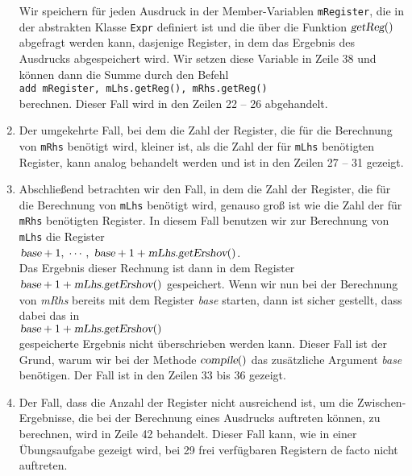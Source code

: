 \begin{enumerate}
      Wir speichern f\"ur jeden Ausdruck in der Member-Variablen \texttt{mRegister}, die in
      der abstrakten Klasse \texttt{Expr} definiert ist und die \"uber die Funktion $\textsl{getReg}()$
      abgefragt werden kann, dasjenige Register, in dem das Ergebnis des Ausdrucks
      abgespeichert wird.  Wir setzen diese Variable in Zeile 38 und k\"onnen dann die Summe
      durch den Befehl
      \\[0.2cm]
      \hspace*{1.3cm}
      \texttt{add mRegister, mLhs.getReg(), mRhs.getReg()}
      \\[0.2cm]
      berechnen.  Dieser Fall wird in den Zeilen 22 -- 26 abgehandelt.
\item Der umgekehrte Fall, bei dem die Zahl der Register, die f\"ur die Berechnung von
      \texttt{mRhs} ben\"otigt wird, kleiner ist, als die Zahl der f\"ur \texttt{mLhs} ben\"otigten
      Register, kann analog behandelt werden und ist in den Zeilen
      27 -- 31 gezeigt.
\item Abschlie{\ss}end betrachten wir den Fall, in dem die Zahl der Register, die f\"ur die Berechnung von
      \texttt{mLhs} ben\"otigt wird, genauso gro{\ss} ist wie die Zahl der f\"ur \texttt{mRhs} ben\"otigten
      Register.  In diesem Fall benutzen wir zur Berechnung von \texttt{mLhs} die Register
      \\[0.2cm]
      \hspace*{1.3cm}
      $\textsl{base} + 1, \;\cdots,\; \textsl{base} + 1 + \textsl{mLhs}.\textsl{getErshov}()$.
      \\[0.2cm]
      Das Ergebnis dieser Rechnung ist dann in dem Register 
      $\textsl{base} + 1 + \textsl{mLhs}.\textsl{getErshov}()$ gespeichert.
      Wenn wir nun bei der Berechnung von \textsl{mRhs} bereits mit dem Register \textsl{base}
      starten, dann ist sicher gestellt, dass dabei das in 
      \\[0.2cm]
      \hspace*{1.3cm}
      $\textsl{base} + 1 + \textsl{mLhs}.\textsl{getErshov}()$ 
      \\[0.2cm]
      gespeicherte Ergebnis nicht \"uberschrieben werden kann.  
      Dieser Fall ist der Grund, warum wir bei der Methode $\textsl{compile}()$ das
      zus\"atzliche Argument \textsl{base} ben\"otigen.  Der Fall ist in den Zeilen 33 bis 36
      gezeigt.
\item Der Fall, dass die Anzahl der Register nicht ausreichend ist, um die
      Zwischen-Ergebnisse, die bei der Berechnung eines Ausdrucks auftreten k\"onnen, zu
      berechnen, wird in Zeile 42 behandelt.  Dieser Fall kann, wie in einer \"Ubungsaufgabe
      gezeigt wird, bei 29 frei verf\"ugbaren Registern de facto nicht auftreten.
\end{enumerate}

